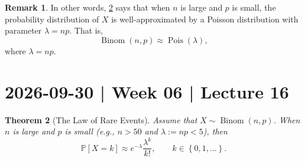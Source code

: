 \documentclass[10pt]{article}
\newtheorem{theorem}{Theorem}
\theoremstyle{definition}
\newtheorem{remark}[theorem]{Remark}
\newcommand{\1}[1]{\textbf{1}_{\left[#1\right]}} %
\def\P{\mathbb{P}} %
\begin{document}
\begin{remark}
  In other words, \cref{thm:law-of-rare-events} says that when $n$ is large
  and $p$ is small, the probability distribution of $X$ is well-approximated
  by a Poisson distribution with parameter $\lambda=np$. That is,
  \begin{equation*}
    \operatorname{Binom}(n,p) \approx \operatorname{Pois}(\lambda),
  \end{equation*}
  where $\lambda=np$.
\end{remark}


\newpage
\section{2026-09-30 | Week 06 | Lecture 16}

\begin{theorem}[The Law of Rare Events]
\label{thm:law-of-rare-events}
Assume that $X \sim \operatorname{Binom}(n,p)$. When $n$ is large and $p$ is small (e.g., $n>50$ and $\lambda:=np<5$), then
\begin{equation}\label{eq:lore}
  \P\left[X  = k \right] \approx e^{-\lambda}\frac{\lambda^{k}}{k!}, \qquad k\in \left\{0,1,\ldots\right\}.
\end{equation}
\end{theorem}
\end{document}
